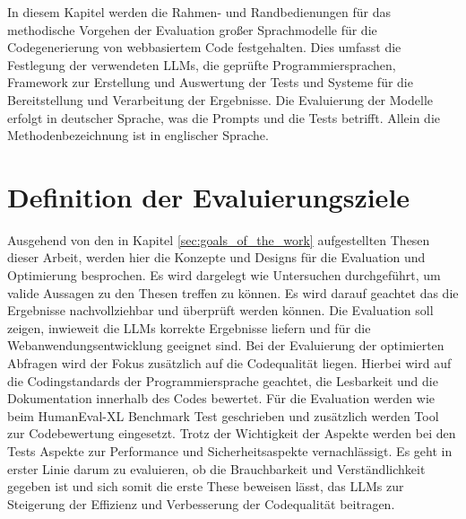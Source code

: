 In diesem Kapitel werden die Rahmen- und Randbedienungen für das methodische Vorgehen der Evaluation großer Sprachmodelle für die Codegenerierung von webbasiertem Code festgehalten. Dies umfasst die Festlegung der verwendeten LLMs, die geprüfte Programmiersprachen, Framework zur Erstellung und Auswertung der Tests und Systeme für die Bereitstellung und Verarbeitung der Ergebnisse. Die Evaluierung der Modelle erfolgt in deutscher Sprache, was die Prompts und die Tests betrifft. Allein die Methodenbezeichnung ist in englischer Sprache.



\section{Definition der Evaluierungsziele}


Ausgehend von den in Kapitel \ref{sec:goals_of_the_work} aufgestellten Thesen dieser Arbeit, werden hier die Konzepte und Designs für die Evaluation und Optimierung besprochen. Es wird dargelegt wie Untersuchen durchgeführt, um valide Aussagen zu den Thesen treffen zu können. Es wird darauf geachtet das die Ergebnisse nachvollziehbar und überprüft werden können.
Die Evaluation soll zeigen, inwieweit die LLMs korrekte Ergebnisse liefern und für die Webanwendungsentwicklung geeignet sind. Bei der Evaluierung der optimierten Abfragen wird der Fokus zusätzlich auf die Codequalität liegen. Hierbei wird auf die Codingstandards der Programmiersprache geachtet, die Lesbarkeit und die Dokumentation innerhalb des Codes bewertet. Für die Evaluation werden wie beim HumanEval-XL Benchmark Test geschrieben und zusätzlich werden Tool zur Codebewertung eingesetzt. Trotz der Wichtigkeit der Aspekte werden bei den Tests Aspekte zur Performance und Sicherheitsaspekte vernachlässigt. Es geht in erster Linie darum zu evaluieren, ob die Brauchbarkeit und Verständlichkeit gegeben ist und sich somit die erste These beweisen lässt, das LLMs zur Steigerung der Effizienz und Verbesserung der Codequalität beitragen.\vspace{0.2cm}


